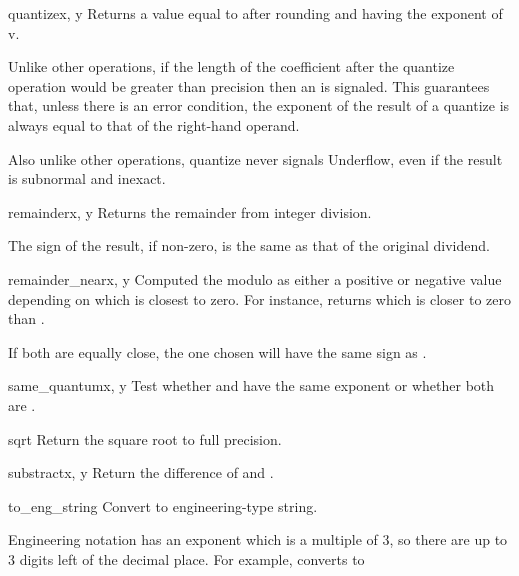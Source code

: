 \begin{methoddesc}{quantize}{x, y}
  Returns a value equal to  after rounding and having the
  exponent of v.

  Unlike other operations, if the length of the coefficient after the quantize
  operation would be greater than precision then an
   is signaled. This guarantees that, unless there
  is an error condition, the exponent of the result of a quantize is always
  equal to that of the right-hand operand.

  Also unlike other operations, quantize never signals Underflow, even
  if the result is subnormal and inexact.  
\end{methoddesc} 

\begin{methoddesc}{remainder}{x, y}
  Returns the remainder from integer division.

  The sign of the result, if non-zero, is the same as that of the original
  dividend. 
\end{methoddesc}
 
\begin{methoddesc}{remainder_near}{x, y}
  Computed the modulo as either a positive or negative value depending
  on which is closest to zero.  For instance,
   returns 
  which is closer to zero than .

  If both are equally close, the one chosen will have the same sign
  as .
\end{methoddesc}

\begin{methoddesc}{same_quantum}{x, y}
  Test whether  and  have the same exponent or whether both are
  .
\end{methoddesc}

\begin{methoddesc}{sqrt}{}
  Return the square root to full precision.
\end{methoddesc}                    

\begin{methoddesc}{substract}{x, y}
  Return the difference of  and .
\end{methoddesc}
 
\begin{methoddesc}{to_eng_string}{}
  Convert to engineering-type string.

  Engineering notation has an exponent which is a multiple of 3, so there
  are up to 3 digits left of the decimal place.  For example, converts
   to 
\end{methoddesc}  

